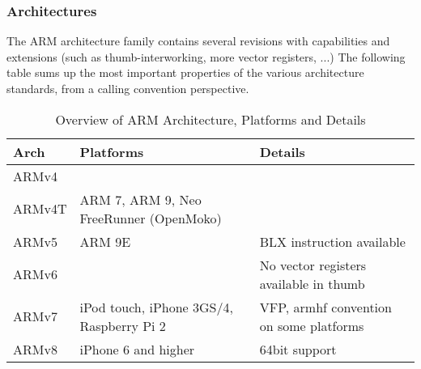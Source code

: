 \clearpage


\subsubsection{Architectures}

The ARM architecture family contains several revisions with capabilities and
extensions (such as thumb-interworking, more vector registers, ...)
The following table sums up the most important properties of the various
architecture standards, from a calling convention perspective.


\begin{table}[h]
\begin{tabular*}{0.95\textwidth}{lll}
Arch   & Platforms & Details \\
\hline
ARMv4  &                                          & \\
ARMv4T & ARM 7, ARM 9, Neo FreeRunner (OpenMoko)  & \\
ARMv5  & ARM 9E                                   & BLX instruction available \\
ARMv6  &                                          & No vector registers available in thumb \\
ARMv7  & iPod touch, iPhone 3GS/4, Raspberry Pi 2 & VFP, armhf convention on some platforms \\
ARMv8  & iPhone 6 and higher                      & 64bit support \\
\end{tabular*}
\caption{Overview of ARM Architecture, Platforms and Details}
\end{table}

